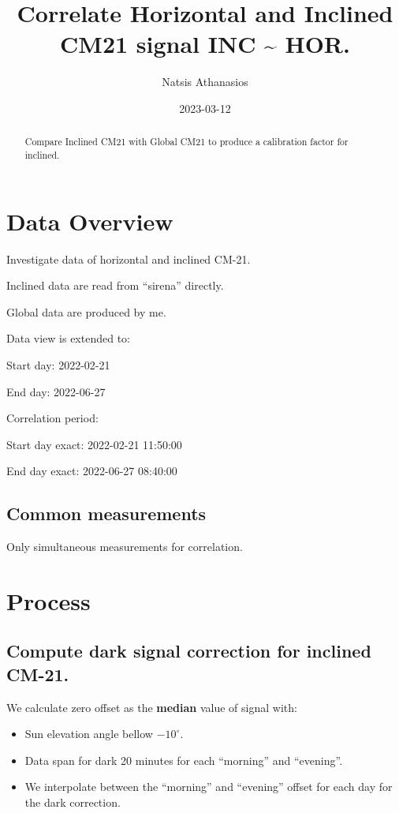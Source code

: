\documentclass[
  10pt,
  a4paper,oneside]{article}
\title{Correlate Horizontal and Inclined CM21 signal \textbf{INC \textasciitilde{} HOR}.}
\author{Natsis Athanasios}
\date{2023-03-12}
\providecommand{\tightlist}{%
  \setlength{\itemsep}{0pt}\setlength{\parskip}{0pt}}
\begin{document}
\maketitle
\begin{abstract}
Compare Inclined CM21 with Global CM21 to produce a calibration factor for inclined.
\end{abstract}

{
\hypersetup{linkcolor=}
\setcounter{tocdepth}{2}
\tableofcontents
}
\hypertarget{data-overview}{%
\section{Data Overview}\label{data-overview}}

Investigate data of horizontal and inclined CM-21.

Inclined data are read from ``sirena'' directly.

Global data are produced by me.

Data view is extended to:

Start day: 2022-02-21

End day: 2022-06-27

Correlation period:

Start day exact: 2022-02-21 11:50:00

End day exact: 2022-06-27 08:40:00

\hypertarget{common-measurements}{%
\subsection{Common measurements}\label{common-measurements}}

Only simultaneous measurements for correlation.

\hypertarget{process}{%
\section{Process}\label{process}}

\hypertarget{compute-dark-signal-correction-for-inclined-cm-21.}{%
\subsection{Compute dark signal correction for inclined CM-21.}\label{compute-dark-signal-correction-for-inclined-cm-21.}}

We calculate zero offset as the \textbf{median} value of signal with:

\begin{itemize}
\tightlist
\item
  Sun elevation angle bellow \(-10^\circ\).
\item
  Data span for dark 20 minutes for each ``morning'' and ``evening''.
\item
  We interpolate between the ``morning'' and ``evening'' offset for each day for the dark correction.
\end{itemize}
\end{document}
